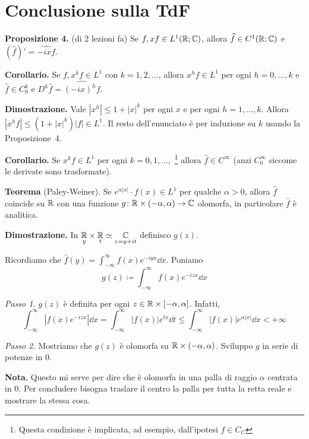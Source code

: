 \section{Conclusione sulla TdF}

\textbf{Proposizione 4.} (di 2 lezioni fa)
Se $f,xf \in L^1(\mathbb R;\mathbb C)$, allora $\widehat{f} \in C^1(\mathbb R;\mathbb C)$ e $(\hat{f})' = \hat{-ixf}$.

\textbf{Corollario.} Se $f,x^kf \in L^1$ con $k=1,2,\ldots$, allora $x^hf \in L^1$ per ogni $h=0,\ldots,k$ e $\hat{f} \in C_0^k$ e $D^h \hat{f} = \hat{(-ix)^h f}$.

\textbf{Dimostrazione.} Vale $|x^h| \leq 1 + |x|^k$ per ogni $x$ e per ogni $h=1,\ldots,k$.
Allora $|x^hf| \leq (1 + |x|^k)|f| \in L^1$.
Il resto dell'enunciato è per induzione su $k$ usando la Proposizione~4.

\vs

\textbf{Corollario.} Se $x^k f \in L^1$ per ogni $k=0,1,\ldots,$ \footnote{Questa condizione è implicata, ad esempio, dall'ipotesi $f \in C_C$} allora $\hat{f} \in C^\infty$ (anzi $C_0^\infty$ siccome le derivate sono trasformate).

\vs

\textbf{Teorema} (Paley-Weiner).
Se $e^{\alpha |x|} \cdot f(x) \in L^1$ per qualche $\alpha > 0$, allora $\hat{f}$ coincide su $\mathbb R$ con una funzione $g \colon \mathbb R \times (-\alpha,\alpha) \to \mathbb C$ olomorfa, in particolare $\hat{f}$ è analitica. 

\textbf{Dimostrazione.} In $\underset{y}{\mathbb R} \times \underset{t}{\mathbb R} \simeq \underset{z=y+it}{\mathbb C}$ definisco $g(z)$.

Ricordiamo che $\hat{f}(y) = \int_{-\infty}^\infty f(x) e^{-iyx} \dd x $.
Poniamo
%
$$
	g(z) \coloneqq \int_{-\infty}^\infty f(x) e^{-izx} \dd x 
$$
%

\textit{Passo 1.} $g(z)$ è definita per ogni $z \in \mathbb R \times [-\alpha,\alpha]$.
Infatti,
%
$$
	\int_{-\infty}^\infty |f(x) e^{-izx}| \dd x 
	= \int_{-\infty}^\infty |f(x)| e^{tx} \dd t
	\leq \int_{-\infty}^\infty |f(x)| e^{\alpha |x|} \dd x < +\infty
$$
%

\textit{Passo 2.} Mostriamo che $g(z)$ è olomorfa su $\mathbb R \times (-\alpha,\alpha)$.
Sviluppo $g$ in serie di potenze in $0$.

\textbf{Nota.} Questo mi serve per dire che è olomorfa in una palla di raggio $\alpha $ centrata in $0$. Per concludere bisogna traslare il centro la palla per tutta la retta reale e mostrare la stessa cosa.

